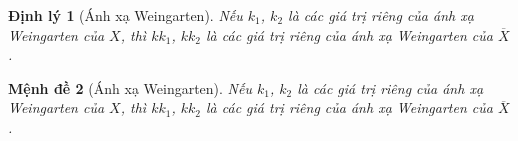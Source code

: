 \documentclass[12pt]{article}
\let\:\overline
\theoremstyle{marginbreak}
\newtheorem{thm}{Định lý}
\theoremstyle{plain}
\newtheorem{thm2}[thm]{Mệnh đề}
\theoremstyle{changebreak}
\begin{document}
\begin{thm}[Ánh xạ Weingarten]
Nếu $k_1$, $k_2$ là các giá trị riêng của ánh xạ Weingarten của $X$,
thì $kk_1$, $kk_2$ là các giá trị riêng của ánh xạ Weingarten của $\:X$.
\end{thm}

\begin{thm2}[Ánh xạ Weingarten]
Nếu $k_1$, $k_2$ là các giá trị riêng của ánh xạ Weingarten của $X$,
thì $kk_1$, $kk_2$ là các giá trị riêng của ánh xạ Weingarten của $\:X$.
\end{thm2}
\end{document}
